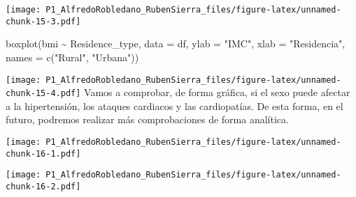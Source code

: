 \documentclass[
]{article}
\newenvironment{Shaded}{\begin{snugshade}}{\end{snugshade}}
\newcommand{\AttributeTok}[1]{\textcolor[rgb]{0.77,0.63,0.00}{#1}}
\newcommand{\FunctionTok}[1]{\textcolor[rgb]{0.00,0.00,0.00}{#1}}
\newcommand{\NormalTok}[1]{#1}
\newcommand{\SpecialCharTok}[1]{\textcolor[rgb]{0.00,0.00,0.00}{#1}}
\newcommand{\StringTok}[1]{\textcolor[rgb]{0.31,0.60,0.02}{#1}}
\begin{document}
\texttt{[image: P1\_AlfredoRobledano\_RubenSierra\_files/figure-latex/unnamed-chunk-15-3.pdf]}

\begin{Shaded}
\begin{Highlighting}[]
\FunctionTok{boxplot}\NormalTok{(bmi  }\SpecialCharTok{\textasciitilde{}}\NormalTok{  Residence\_type, }\AttributeTok{data =}\NormalTok{ df, }\AttributeTok{ylab =} \StringTok{"IMC"}\NormalTok{, }\AttributeTok{xlab =} \StringTok{"Residencia"}\NormalTok{, }\AttributeTok{names =} \FunctionTok{c}\NormalTok{(}\StringTok{"Rural"}\NormalTok{, }\StringTok{"Urbana"}\NormalTok{))}
\end{Highlighting}
\end{Shaded}

\texttt{[image: P1\_AlfredoRobledano\_RubenSierra\_files/figure-latex/unnamed-chunk-15-4.pdf]}
Vamos a comprobar, de forma gráfica, si el sexo puede afectar a la
hipertensión, los ataques cardiacos y las cardiopatías. De esta forma,
en el futuro, podremos realizar más comprobaciones de forma analítica.

\begin{Shaded}
\end{Shaded}

\texttt{[image: P1\_AlfredoRobledano\_RubenSierra\_files/figure-latex/unnamed-chunk-16-1.pdf]}

\begin{Shaded}
\end{Shaded}

\texttt{[image: P1\_AlfredoRobledano\_RubenSierra\_files/figure-latex/unnamed-chunk-16-2.pdf]}

\begin{Shaded}
\end{Shaded}
\end{document}
